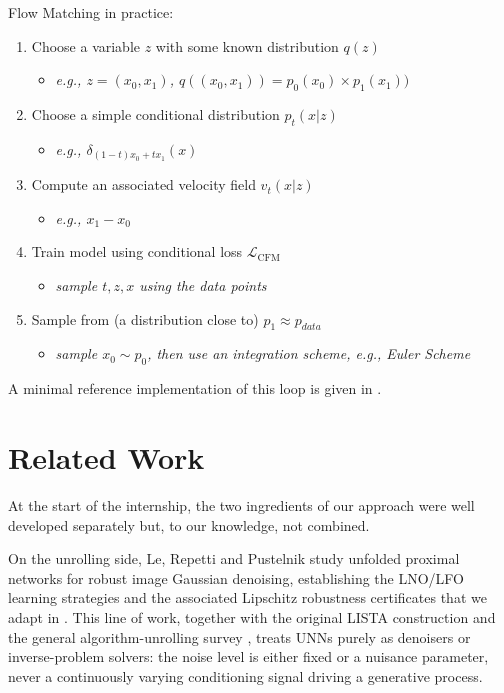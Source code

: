 \documentclass[a4paper,11pt]{article}
\theoremstyle{plain}{\theorembodyfont{\rmfamily}%
\newtheorem{proposition}[theorem]{Proposition}}
\theoremstyle{plain}{\theorembodyfont{\rmfamily}%
\newtheorem{notation}[theorem]{Notation}}
\theoremstyle{plain}{\theorembodyfont{\rmfamily}%
\newtheorem{assumption}[theorem]{Assumption}}
\theoremstyle{plain}{\theorembodyfont{\rmfamily}%
\newtheorem{problem}[theorem]{Problem}}
\theoremstyle{plain}{\theorembodyfont{\rmfamily}%
\newtheorem{example}[theorem]{Example}}
\theoremstyle{plain}{\theorembodyfont{\rmfamily}%
\newtheorem{remark}[theorem]{Remark}}
\theoremstyle{plain}{\theorembodyfont{\rmfamily}%
\newtheorem{definition}[theorem]{Definition}}
\theoremstyle{plain}{\theorembodyfont{\rmfamily}%
\newtheorem{question}[theorem]{Question}}
\numberwithin{equation}{section}
\begin{document}
Flow Matching in practice:
\begin{enumerate}
    \item Choose a variable $z$ with some known distribution $q(z)$
        \begin{itemize}
            \item \textit{e.g., $z = (x_0, x_1)$, $q((x_0,x_1)) = p_0(x_0) \times p_1(x_1))$}
        \end{itemize}
    \item Choose a simple conditional distribution $p_t(x |z)$
        \begin{itemize}
            \item \textit{e.g., $\delta_{(1-t)x_0 + tx_1}(x)$}
        \end{itemize}
    \item Compute an associated velocity field $v_{t}(x|z)$
        \begin{itemize}
            \item \textit{e.g., $x_1 - x_0$}
        \end{itemize}
    \item Train model using conditional loss $\mathcal{L}_{\text{CFM}}$
        \begin{itemize}
            \item \textit{sample $t, z, x$ using the data points}
        \end{itemize}
    \item Sample from (a distribution close to) $p_1 \approx p_{data}$
        \begin{itemize}
            \item \textit{sample $x_0 \sim p_0$, then use an integration scheme, e.g., Euler Scheme}
        \end{itemize}
\end{enumerate}
A minimal reference implementation of this loop is given in .

\section{Related Work}
\label{sec:related}

At the start of the internship, the two ingredients of our approach were well
developed separately but, to our knowledge, not combined.

On the unrolling side, Le, Repetti and Pustelnik \cite{le2024unfolded} study
unfolded proximal networks for robust image Gaussian denoising, establishing the
LNO/LFO learning strategies and the associated Lipschitz robustness certificates
that we adapt in . This line of work, together with the
original LISTA construction \cite{gregor2010learning} and the general algorithm-unrolling
survey \cite{monga2021algorithm}, treats UNNs purely as denoisers or
inverse-problem solvers: the noise level is either fixed or a nuisance parameter,
never a continuously varying conditioning signal driving a generative process.
\end{document}

